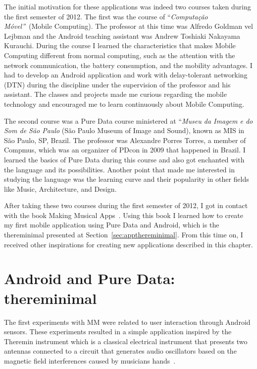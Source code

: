 The initial motivation for these applications was indeed two courses taken during the first semester of 2012.
The first was the course of ``\textit{Computação Móvel''}~(Mobile Computing).
The professor at this time was Alfredo Goldman vel Lejbman and the Android teaching assistant was Andrew Toshiaki Nakayama Kurauchi. %
During the course I learned the characteristics that makes Mobile Computing different from normal computing, such as the attention with the network communication, the battery consumption, and the mobility advantages. %
I had to develop an Android application and work with delay-tolerant networking (DTN) during the discipline under the supervision of the professor and his assistant.
The classes and projects made me curious regarding the mobile technology and encouraged me to learn continuously about Mobile Computing.

The second course was a Pure Data course ministered at ``\textit{Museu da Imagem e do Som de São Paulo} (São Paulo Museum of Image and Sound), known as MIS in São Paulo, SP, Brazil.
The professor was Alexandre Porres Torres, a member of Compmus, which was an organizer of PDcon in 2009 that happened in Brazil.
I learned the basics of Pure Data during this course and also got enchanted with the language and its possibilities.
Another point that made me interested in studying the language was the learning curve and their popularity in other fields like Music, Architecture, and Design.

After taking these two courses during the first semester of 2012, I got in contact with the book Making Musical Apps~\citep{Brinkmann2012makingmusicalapps}.
Using this book I learned how to create my first mobile application using Pure Data and Android, which is the thereminimal presented at Section~\ref{sec:appthereminimal}.
From this time on, I received other inspirations for creating new applications described in this chapter.

\section{Android and Pure Data: thereminimal}
\label{apesec:appthereminimal}

The first experiments with MM were related to user interaction through Android sensors.
These experiments resulted in a simple application inspired by the Theremin instrument which is a classical electrical instrument that presents two antennas connected to a circuit that generates audio oscillators based on the magnetic field interferences caused by musicians hands~\citep{Glinsky1992Theremin}.

